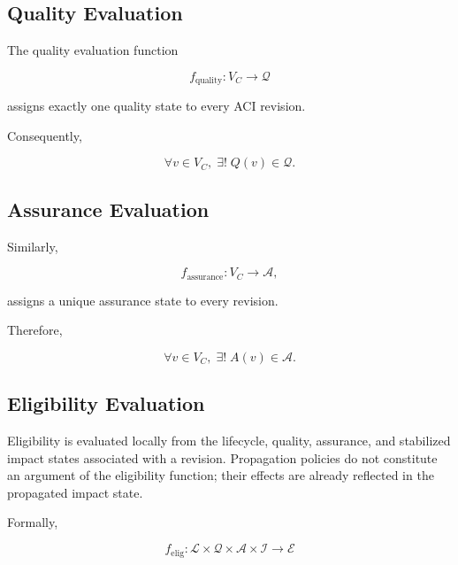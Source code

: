 \documentclass[10pt]{article}
\begin{document}
\subsection{Quality Evaluation}

The quality evaluation function

\begin{equation}
	f_{\mathrm{quality}} : V_C \rightarrow \mathcal Q
	\label{eq:quality_function}
\end{equation}

assigns exactly one quality state to every ACI revision.

Consequently,

\begin{equation}
	\forall v\in V_C,\;
	\exists!\;
	Q(v)\in\mathcal{Q}.
	\label{eq:quality_total}
\end{equation}

\subsection{Assurance Evaluation}

Similarly,

\begin{equation}
	f_{\mathrm{assurance}} : V_C \rightarrow \mathcal A,
	\label{eq:assurance_function}
\end{equation}

assigns a unique assurance state to every revision.

Therefore,

\begin{equation}
	\forall v\in V_C,\;
	\exists!\;
	A(v)\in\mathcal{A}.
	\label{eq:assurance_total}
\end{equation}

\subsection{Eligibility Evaluation}

Eligibility is evaluated locally from the lifecycle, quality, assurance, and stabilized impact states associated with a revision. Propagation policies do not constitute an argument of the eligibility function; their effects are already reflected in the propagated impact state.

Formally,

\begin{equation}
	f_{\mathrm{elig}}
	:
	\mathcal{L}
	\times
	\mathcal{Q}
	\times
	\mathcal{A}
	\times
	\mathcal{I}
	\rightarrow
	\mathcal{E}
	\label{eq:eligibility_function_formal}
\end{equation}
\end{document}
